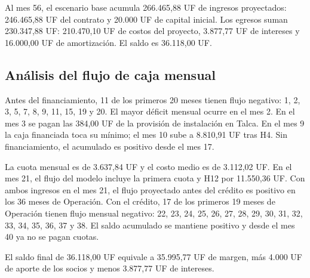 Al mes 56, el escenario base acumula 266.465,88 UF de ingresos proyectados: 246.465,88 UF del contrato y 20.000 UF de capital inicial. Los egresos suman 230.347,88 UF: 210.470,10 UF de costos del proyecto, 3.877,77 UF de intereses y 16.000,00 UF de amortización. El saldo es 36.118,00 UF.

\subsection{Análisis del flujo de caja mensual}
\label{sec:e2-curva-flujo-mensual}

Antes del financiamiento, 11 de los primeros 20 meses tienen flujo negativo: 1, 2, 3, 5, 7, 8, 9, 11, 15, 19 y 20. El mayor déficit mensual ocurre en el mes 2. En el mes 3 se pagan las 384,00 UF de la provisión de instalación en Talca. En el mes 9 la caja financiada toca su mínimo; el mes 10 sube a 8.810,91 UF tras H4. Sin financiamiento, el acumulado es positivo desde el mes 17.

La cuota mensual es de 3.637,84 UF y el costo medio es de 3.112,02 UF. En el mes 21, el flujo del modelo incluye la primera cuota y H12 por 11.550,36 UF. Con ambos ingresos en el mes 21, el flujo proyectado antes del crédito es positivo en los 36 meses de Operación. Con el crédito, 17 de los primeros 19 meses de Operación tienen flujo mensual negativo: 22, 23, 24, 25, 26, 27, 28, 29, 30, 31, 32, 33, 34, 35, 36, 37 y 38. El saldo acumulado se mantiene positivo y desde el mes 40 ya no se pagan cuotas.

El saldo final de 36.118,00 UF equivale a 35.995,77 UF de margen, más 4.000 UF de aporte de los socios y menos 3.877,77 UF de intereses.
